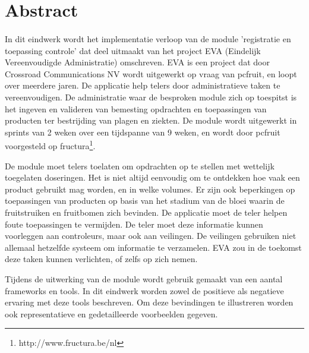\section* {Abstract}

\paragraph {}In dit eindwerk wordt het implementatie verloop van de module 'registratie en
toepassing controle' dat deel uitmaakt van het project EVA (Eindelijk Vereenvoudigde
Administratie) omschreven. EVA is een project dat door Crossroad Communications NV wordt
uitgewerkt op vraag van pcfruit, en loopt over meerdere jaren. De applicatie help telers
door administratieve taken te vereenvoudigen. De administratie waar de besproken module
zich op toespitst is het ingeven en valideren van bemesting opdrachten en toepassingen van
producten ter bestrijding van plagen en ziekten. De module wordt uitgewerkt in sprints van
2 weken over een tijdspanne van 9 weken, en wordt door pcfruit voorgesteld op
fructura\footnote{http://www.fructura.be/nl}.

De module moet telers toelaten om opdrachten op te stellen met wettelijk
toegelaten doseringen. Het is niet altijd eenvoudig om te ontdekken hoe vaak een product
gebruikt mag worden, en in welke volumes. Er zijn ook beperkingen op toepassingen van
producten op basis van het stadium van de bloei waarin de fruitstruiken en fruitbomen
zich bevinden. De applicatie moet de teler helpen foute toepassingen te vermijden.
De teler moet deze informatie kunnen voorleggen aan controleurs, maar ook aan veilingen.
De veilingen gebruiken niet allemaal hetzelfde systeem om informatie te verzamelen. EVA
zou in de toekomst deze taken kunnen verlichten, of zelfs op zich nemen.

Tijdens de uitwerking van de module wordt gebruik gemaakt van een aantal frameworks en
tools. In dit eindwerk worden zowel de positieve als negatieve ervaring met deze tools
beschreven. Om deze bevindingen te illustreren worden ook representatieve en gedetailleerde
voorbeelden gegeven.
